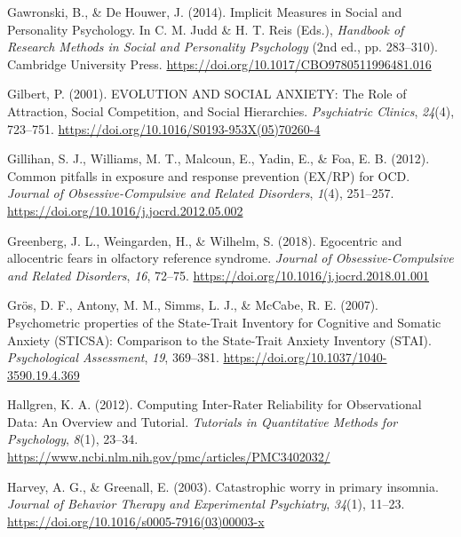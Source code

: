 \documentclass[
  man,floatsintext]{apa7}
\newlength{\cslhangindent}
\newlength{\cslentryspacingunit} %
\newenvironment{CSLReferences}[2] %
 {%
  \setlength{\parindent}{0pt}
  \ifodd #1
  \let\oldpar\par
  \def\par{\hangindent=\cslhangindent\oldpar}
  \fi
  \setlength{\parskip}{#2\cslentryspacingunit}
 }%
 {}
\begin{document}
\begin{CSLReferences}{1}{0}
\leavevmode{}%
Gawronski, B., \& De Houwer, J. (2014). Implicit Measures in Social and Personality Psychology. In C. M. Judd \& H. T. Reis (Eds.), \emph{Handbook of Research Methods in Social and Personality Psychology} (2nd ed., pp. 283--310). Cambridge University Press. \url{https://doi.org/10.1017/CBO9780511996481.016}

\leavevmode{}%
Gilbert, P. (2001). EVOLUTION AND SOCIAL ANXIETY: The Role of Attraction, Social Competition, and Social Hierarchies. \emph{Psychiatric Clinics}, \emph{24}(4), 723--751. \url{https://doi.org/10.1016/S0193-953X(05)70260-4}

\leavevmode{}%
Gillihan, S. J., Williams, M. T., Malcoun, E., Yadin, E., \& Foa, E. B. (2012). Common pitfalls in exposure and response prevention (EX/RP) for OCD. \emph{Journal of Obsessive-Compulsive and Related Disorders}, \emph{1}(4), 251--257. \url{https://doi.org/10.1016/j.jocrd.2012.05.002}

\leavevmode{}%
Greenberg, J. L., Weingarden, H., \& Wilhelm, S. (2018). Egocentric and allocentric fears in olfactory reference syndrome. \emph{Journal of Obsessive-Compulsive and Related Disorders}, \emph{16}, 72--75. \url{https://doi.org/10.1016/j.jocrd.2018.01.001}

\leavevmode{}%
Grös, D. F., Antony, M. M., Simms, L. J., \& McCabe, R. E. (2007). Psychometric properties of the State-Trait Inventory for Cognitive and Somatic Anxiety (STICSA): Comparison to the State-Trait Anxiety Inventory (STAI). \emph{Psychological Assessment}, \emph{19}, 369--381. \url{https://doi.org/10.1037/1040-3590.19.4.369}

\leavevmode{}%
Hallgren, K. A. (2012). Computing Inter-Rater Reliability for Observational Data: An Overview and Tutorial. \emph{Tutorials in Quantitative Methods for Psychology}, \emph{8}(1), 23--34. \url{https://www.ncbi.nlm.nih.gov/pmc/articles/PMC3402032/}

\leavevmode{}%
Harvey, A. G., \& Greenall, E. (2003). Catastrophic worry in primary insomnia. \emph{Journal of Behavior Therapy and Experimental Psychiatry}, \emph{34}(1), 11--23. \url{https://doi.org/10.1016/s0005-7916(03)00003-x}


\end{CSLReferences}
\end{document}
